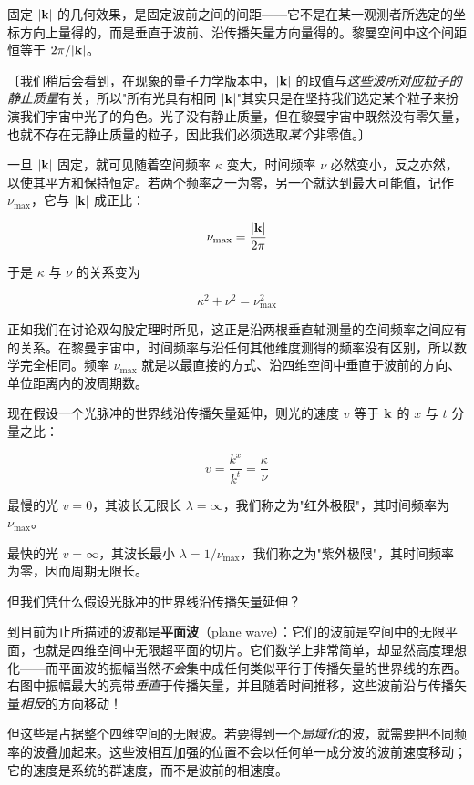 固定 $|\mathbf{k}|$ 的几何效果，是固定波前之间的间距——它不是在某一观测者所选定的坐标方向上量得的，而是垂直于波前、沿传播矢量方向量得的。黎曼空间中这个间距恒等于 $2\pi/|\mathbf{k}|$。

〔我们稍后会看到，在现象的量子力学版本中，$|\mathbf{k}|$ 的取值与\emph{这些波所对应粒子的静止质量}有关，所以"所有光具有相同 $|\mathbf{k}|$"其实只是在坚持我们选定某个粒子来扮演我们宇宙中光子的角色。光子没有静止质量，但在黎曼宇宙中既然没有零矢量，也就不存在无静止质量的粒子，因此我们必须选取\emph{某个}非零值。〕

一旦 $|\mathbf{k}|$ 固定，就可见随着空间频率 $\kappa$ 变大，时间频率 $\nu$ 必然变小，反之亦然，以使其平方和保持恒定。若两个频率之一为零，另一个就达到最大可能值，记作 $\nu_{\max}$，它与 $|\mathbf{k}|$ 成正比：

\[
\nu_{\max}=\frac{|\mathbf{k}|}{2\pi}
\]

于是 $\kappa$ 与 $\nu$ 的关系变为

\[
\kappa^{2}+\nu^{2}=\nu_{\max}^{2}
\]

正如我们在讨论双勾股定理时所见，这正是沿两根垂直轴测量的空间频率之间应有的关系。在黎曼宇宙中，时间频率与沿任何其他维度测得的频率没有区别，所以数学完全相同。频率 $\nu_{\max}$ 就是以最直接的方式、沿四维空间中垂直于波前的方向、单位距离内的波周期数。


现在假设一个光脉冲的世界线沿传播矢量延伸，则光的速度 $v$ 等于 $\mathbf{k}$ 的 $x$ 与 $t$ 分量之比：

\[
v=\frac{k^{x}}{k^{t}}=\frac{\kappa}{\nu}
\]

最慢的光 $v=0$，其波长无限长 $\lambda=\infty$，我们称之为"红外极限"，其时间频率为 $\nu_{\max}$。

最快的光 $v=\infty$，其波长最小 $\lambda=1/\nu_{\max}$，我们称之为"紫外极限"，其时间频率为零，因而周期无限长。


但我们凭什么假设光脉冲的世界线沿传播矢量延伸？

到目前为止所描述的波都是\textbf{平面波}（plane wave）：它们的波前是空间中的无限平面，也就是四维空间中无限超平面的切片。它们数学上非常简单，却显然高度理想化——而平面波的振幅当然\emph{不会}集中成任何类似平行于传播矢量的世界线的东西。右图中振幅最大的亮带\emph{垂直}于传播矢量，并且随着时间推移，这些波前沿与传播矢量\emph{相反}的方向移动！

但这些是占据整个四维空间的无限波。若要得到一个\emph{局域化}的波，就需要把不同频率的波叠加起来。这些波相互加强的位置不会以任何单一成分波的波前速度移动；它的速度是系统的群速度，而不是波前的相速度。


